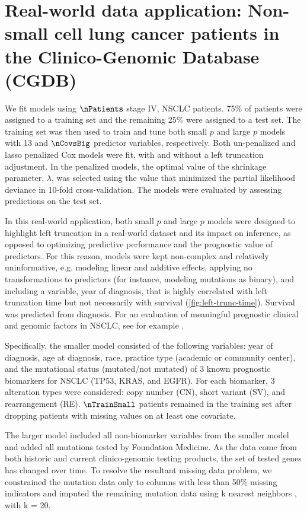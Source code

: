 \documentclass[11pt,final,fleqn]{article}\usepackage[]{graphicx}\usepackage[]{color}
\theoremstyle{plain}
\begin{document}
\section{Real-world data application: Non-small cell lung cancer patients in the Clinico-Genomic Database (CGDB)} \label{sec:rwd}
We fit models using $\nPatients$ stage IV, NSCLC patients. 75\%  of patients were assigned to a training set and the remaining 25\% were assigned to a test set. The training set was then used to train and tune both small $p$ and large $p$ models with 13 and $\nCovsBig$ predictor variables, respectively. Both un-penalized and lasso penalized Cox models were fit, with and without a left truncation adjustment. In the penalized models, the optimal value of the shrinkage parameter,  $\lambda$, was selected using the value that minimized the partial likelihood deviance in 10-fold cross-validation.  The models were evaluated by assessing predictions on the test set.

In this real-world application, both small $p$ and large $p$ models were designed to highlight left truncation in a real-world dataset and its impact on inference, as opposed to optimizing predictive performance and the prognostic value of predictors. For this reason, models were kept non-complex and relatively uninformative, e.g. modeling linear and additive effects, applying no transformations to predictors (for instance, modeling mutations as binary), and including a variable, year of diagnosis, that is highly correlated with left truncation time but not necessarily with survival (\autoref{fig:left-trunc-time}). Survival was predicted from diagnosis. For an evaluation of meaningful prognostic clinical and genomic factors in NSCLC, see for example \citet{lai2020nsclc}.

Specifically, the smaller model consisted of the following variables: year of diagnosis, age at diagnosis, race, practice type (academic or community center), and the mutational status (mutated/not mutated) of 3 known prognostic biomarkers for NSCLC (TP53, KRAS, and EGFR). For each biomarker, 3 alteration types were considered: copy number (CN), short variant (SV), and rearrangement (RE). $\nTrainSmall$ patients remained in the training set after dropping patients with missing values on at least one covariate. 

The larger model included all non-biomarker variables from the smaller model and added all mutations tested by Foundation Medicine. As the data come from both historic and current clinico-genomic testing products, the set of tested genes has changed over time. To resolve the resultant missing data problem, we constrained the mutation data only to columns with less than 50\% missing indicators and imputed the remaining mutation data using k nearest neighbors \citep{troyanskaya_missing_2001}, with k = 20. 
\end{document}

